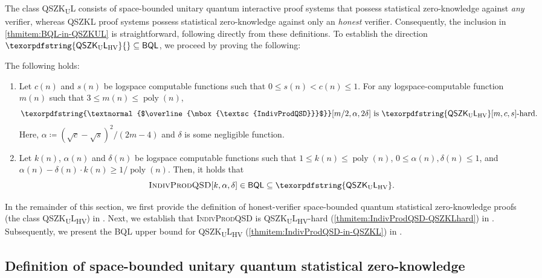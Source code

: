 \documentclass[11pt, a4paper]{article}
\numberwithin{equation}{section}
\numberwithin{figure}{section}
\newcommand{\QSZKL}{\textnormal{\textsf{QSZKL}}\xspace}
\newcommand{\QSZKUL}{\texorpdfstring{\textnormal{\textsf{QSZK}\textsubscript{\textnormal{U}}\textsf{L}}}\xspace}
\newcommand{\QSZKULHV}{\texorpdfstring{\textnormal{\textsf{QSZK}\textsubscript{\textnormal{U}}\textsf{L}}\textsubscript{\textnormal{HV}}}\xspace}
\newcommand{\BQL}{\textnormal{\textsf{BQL}}\xspace}
\newcommand{\textoverline}[1]{$\overline{\mbox{#1}}$}
\newcommand{\IndivProdQSD}{\textnormal{\textsc{IndivProdQSD}}\xspace}
\newcommand{\coIndivProdQSD}{\texorpdfstring{\textnormal{\textoverline{\textsc{IndivProdQSD}}}}\xspace}
\DeclareMathOperator\poly{poly}
\begin{document}
The class \QSZKUL{} consists of space-bounded unitary quantum interactive proof systems that possess statistical zero-knowledge against \textit{any} verifier, whereas \QSZKL{} proof systems possess statistical zero-knowledge against only an \textit{honest} verifier. 
Consequently, the inclusion in \ref{thmitem:BQL-in-QSZKUL} is straightforward, following directly from these definitions. 
To establish the direction $\QSZKULHV{} \subseteq \BQL{}$, we proceed by proving the following: 

\begin{theorem}[\IndivProdQSD{} is \QSZKULHV{}-complete]
    \label{thm:IndivProdQSD-QSZKLcomplete}
    The following holds: 
    \begin{enumerate}[label={\upshape(\arabic*)}, itemsep=0.33em, topsep=0.33em, parsep=0.33em]
        \item Let $c(n)$ and $s(n)$ be logspace computable functions such that $0 \leq s(n) < c(n) \leq 1$. For any logspace-computable function $m(n)$ such that $3 \leq m(n) \leq \poly(n)$, \label{thmitem:IndivProdQSD-QSZKLhard}
        \[ \coIndivProdQSD[m/2,\alpha,2\delta] \text{ is } \QSZKULHV[m,c,s]\text{-hard}.\]
        Here, $\alpha \coloneqq (\sqrt{c}-\sqrt{s})^2/(2m-4)$ and $\delta$ is some negligible function. 
        \item  Let $k(n)$, $\alpha(n)$ and $\delta(n)$ be logspace computable functions such that $1 \leq k(n) \leq \poly(n)$, $0 \leq \alpha(n),\delta(n) \leq 1$, and $\alpha(n) - \delta(n) \cdot k(n) \geq 1/\poly(n)$. Then, it holds that
        \label{thmitem:IndivProdQSD-in-QSZKL}
        \[ \IndivProdQSD[k,\alpha,\delta] \in \BQL \subseteq \QSZKULHV. \]
    \end{enumerate}
\end{theorem}

\vspace{1em}
In the remainder of this section, we first provide the definition of honest-verifier space-bounded quantum statistical zero-knowledge proofs (the class \QSZKULHV{}) in . Next, we establish that \IndivProdQSD{} is \QSZKULHV{}-hard (\ref{thmitem:IndivProdQSD-QSZKLhard}) in . Subsequently, we present the \BQL{} upper bound for \QSZKULHV{} (\ref{thmitem:IndivProdQSD-in-QSZKL}) in . 

\subsection{Definition of space-bounded unitary quantum statistical zero-knowledge}
\label{subsec:QSZKL-definition}
\end{document}
